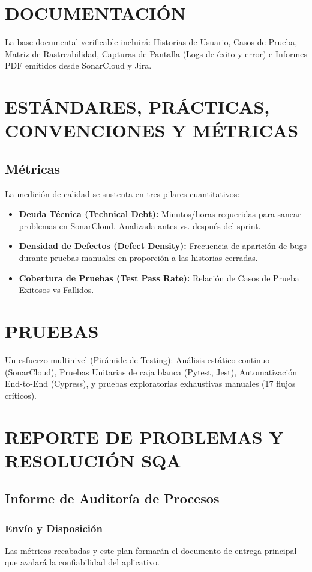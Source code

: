 \documentclass[12pt,a4paper]{article}
\begin{document}
\section{DOCUMENTACIÓN}
La base documental verificable incluirá: Historias de Usuario, Casos de Prueba, Matriz de Rastreabilidad, Capturas de Pantalla (Logs de éxito y error) e Informes PDF emitidos desde SonarCloud y Jira.

\section{ESTÁNDARES, PRÁCTICAS, CONVENCIONES Y MÉTRICAS}
\subsection{Métricas}
La medición de calidad se sustenta en tres pilares cuantitativos:
\begin{itemize}
    \item \textbf{Deuda Técnica (Technical Debt):} Minutos/horas requeridas para sanear problemas en SonarCloud. Analizada antes vs. después del sprint.
    \item \textbf{Densidad de Defectos (Defect Density):} Frecuencia de aparición de bugs durante pruebas manuales en proporción a las historias cerradas.
    \item \textbf{Cobertura de Pruebas (Test Pass Rate):} Relación de Casos de Prueba Exitosos vs Fallidos.
\end{itemize}

\section{PRUEBAS}
Un esfuerzo multinivel (Pirámide de Testing): Análisis estático continuo (SonarCloud), Pruebas Unitarias de caja blanca (Pytest, Jest), Automatización End-to-End (Cypress), y pruebas exploratorias exhaustivas manuales (17 flujos críticos).

\section{REPORTE DE PROBLEMAS Y RESOLUCIÓN SQA}
\subsection{Informe de Auditoría de Procesos}
\subsubsection{Envío y Disposición}
Las métricas recabadas y este plan formarán el documento de entrega principal que avalará la confiabilidad del aplicativo.
\end{document}
